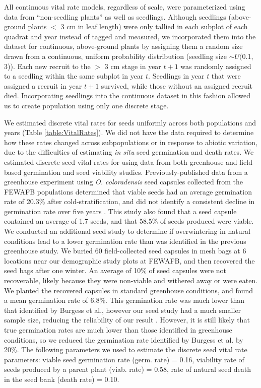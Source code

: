 \documentclass[12pt, letterpaper]{article}
\begin{document}
All continuous vital rate models, regardless of scale, were parameterized using data from “non-seedling plants” as well as seedlings. Although seedlings (above-ground plants $<$ 3 cm in leaf length) were only tallied in each subplot of each quadrat and year instead of tagged and measured, we incorporated them into the dataset for continuous, above-ground plants by assigning them a random size drawn from a continuous, uniform probability distribution (seedling size $\sim U($0.1, 3)). Each new recruit to the $>$ 3 cm stage in year $t+1$ was randomly assigned to a seedling within the same subplot in year $t$. Seedlings in year $t$ that were assigned a recruit in year $t+1$ survived, while those without an assigned recruit died. Incorporating seedlings into the continuous dataset in this fashion allowed us to create population using only one discrete stage.

We estimated discrete vital rates for seeds uniformly across both populations and years (Table \ref{table:VitalRates}). We did not have the data required to determine how these rates changed across subpopulations or in response to abiotic variation, due to the difficulties of estimating \textit{in situ} seed germination and death rates. We estimated discrete seed vital rates for using data from both greenhouse and field-based germination and seed viability studies. Previously-published data from a greenhouse experiment using \textit{O. coloradensis} seed capsules collected from the FEWAFB populations determined that viable seeds had an average germination rate of 20.3\% after cold-stratification, and did not identify a consistent decline in germination rate over five years \cite{Burgess2005CapsuleColoradensis}. This study also found that a seed capsule contained an average of 1.7 seeds, and that 58.5\% of seeds produced were viable. We conducted an additional seed study to determine if overwintering in natural conditions lead to a lower germination rate than was identified in the previous greenhouse study. We buried 60 field-collected seed capsules in mesh bags at 6 locations near our demographic study plots at FEWAFB, and then recovered the seed bags after one winter. An average of 10\% of seed capsules were not recoverable, likely because they were non-viable and withered away or were eaten. We planted the recovered capsules in standard greenhouse conditions, and found a mean germination rate of 6.8\%. This germination rate was much lower than that identified by Burgess et al., however our seed study had a much smaller sample size, reducing the reliability of our result \cite{Burgess2005CapsuleColoradensis}. However, it is still likely that true germination rates are much lower than those identified in greenhouse conditions, so we reduced the germination rate identified by Burgess et al. by 20\%. The following parameters we used to estimate the discrete seed vital rate parameters: viable seed germination rate (germ. rate) = 0.16, viability rate of seeds produced by a parent plant (viab. rate) = 0.58, rate of natural seed death in the seed bank (death rate) = 0.10. 
\end{document}
